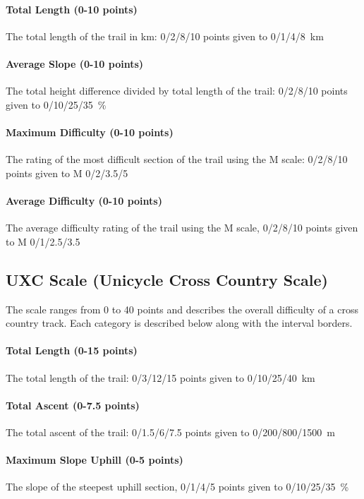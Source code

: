 \documentclass[a4paper,oneside]{scrartcl}
\begin{document}
\paragraph{Total Length (0-10 points)}
The total length of the trail in km: 0/2/8/10 points given to 0/1/4/8~km

\paragraph{Average Slope (0-10 points)}
The total height difference divided by total length of the trail: 0/2/8/10
points given to 0/10/25/35~\%

\paragraph{Maximum Difficulty (0-10 points)}
The rating of the most difficult section of the trail using the M scale:
0/2/8/10 points given to M 0/2/3.5/5

\paragraph{Average Difficulty (0-10 points)}
The average difficulty rating of the trail using the M scale, 0/2/8/10 points
given to M 0/1/2.5/3.5



\subsection{UXC Scale (Unicycle Cross Country Scale)}
\label{sec:uxc-scale}
The scale ranges from 0 to 40 points and describes the overall difficulty of a
cross country track. Each category is described below along with the
interval borders.

\paragraph{Total Length (0-15 points)}
The total length of the trail: 0/3/12/15 points given to 0/10/25/40~km

\paragraph{Total Ascent (0-7.5 points)} 
The total ascent of the trail: 0/1.5/6/7.5 points given to 0/200/800/1500~m

\paragraph{Maximum Slope Uphill (0-5 points)} 
The slope of the steepest uphill section, 0/1/4/5 points given to 0/10/25/35~\%
\end{document}
